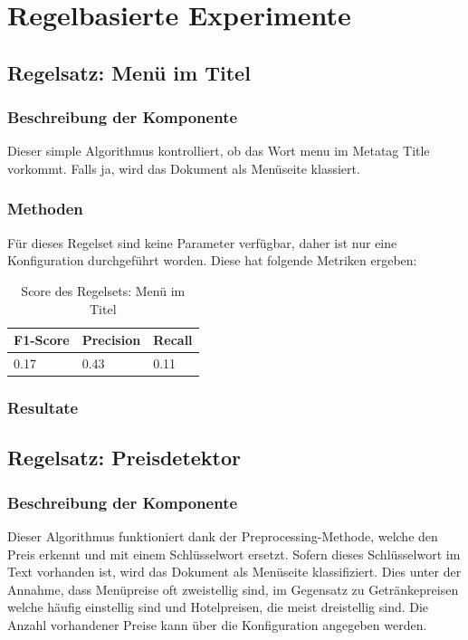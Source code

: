 \section{Regelbasierte Experimente}
\subsection{Regelsatz: Menü im Titel}
\subsubsection{Beschreibung der Komponente}
Dieser simple Algorithmus kontrolliert, ob das Wort \glqq menu\grqq{} im Metatag \glqq Title\grqq{} vorkommt.
Falls ja, wird das Dokument als Menüseite klassiert.
\subsubsection{Methoden}
Für dieses Regelset sind keine Parameter verfügbar, daher ist nur eine Konfiguration durchgeführt worden.
Diese hat folgende Metriken ergeben:\\
\begin{table}[H]
	\caption{Score des Regelsets: Menü im Titel}
	\centering
	\begin{tabular}{|l|l|l|}
		\hline
		F1-Score & Precision & Recall\\
		\hline
		0.17 & 0.43 & 0.11  \\
		\hline
	\end{tabular}
\end{table}
\subsubsection{Resultate}
\subsection{Regelsatz: Preisdetektor}
\subsubsection{Beschreibung der Komponente}
Dieser Algorithmus funktioniert dank der Preprocessing-Methode, welche den Preis erkennt und mit einem Schlüsselwort ersetzt.
Sofern dieses Schlüsselwort im Text vorhanden ist, wird das Dokument als Menüseite klassifiziert. Dies unter der Annahme, dass Menüpreise oft zweistellig sind, im Gegensatz zu Getränkepreisen welche häufig einstellig sind und Hotelpreisen, die meist dreistellig sind.
Die Anzahl vorhandener Preise kann über die Konfiguration angegeben werden.
